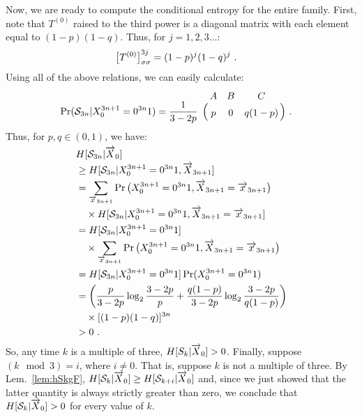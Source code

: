 Now, we are ready to compute the conditional entropy for the entire family.
First, note that $T^{(0)}$ raised to the third power is a diagonal matrix with 
each element equal to $(1-p)(1-q)$. Thus, for $j=1,2,3\ldots$:
\begin{align*}
\bigl[T^{(0)}\bigr]^{3j}_{\sigma\sigma} &= (1-p)^j(1-q)^j ~.
\end{align*}
Using all of the above relations, we can easily calculate:
\begin{align*}
\Pr(\CausalState_{3n} | \MeasSymbol_0^{3n+1} = 0^{3n}1)
&= \frac{1}{3-2p}
\bordermatrix{
& A & B & C \cr
& p & 0 & q(1-p)
} ~.
\end{align*}
Thus, for $p,q \in (0,1)$, we have:
\begin{align*}
&H[\mathcal{S}_{3n} | \smash{\overrightarrow{{X}}}_0] \\
    &\geq H[\mathcal{S}_{3n} | {X}_0^{3n+1} = 0^{3n}1, 
                                \smash{\overrightarrow{{X}}}_{3n+1}] \\
    &= \sum_{\smash{\overrightarrow{{x}}}_{3n+1}} \Pr\left(
                {X}_0^{3n+1} = 0^{3n}1, 
                \smash{\overrightarrow{{X}}}_{3n+1}=\smash{\overrightarrow{{x}}}_{3n+1}
               \right) \\
    &\quad\times H[\mathcal{S}_{3n} | {X}_0^{3n+1} = 0^{3n}1, \smash{\overrightarrow{{X}}}_{3n+1} = \smash{\overrightarrow{{x}}}_{3n+1}] \\
    &= H[\mathcal{S}_{3n} | {X}_0^{3n+1} = 0^{3n}1] \\
    &\quad\times 
       \sum_{\smash{\overrightarrow{{x}}}_{3n+1}} \Pr\left(
                {X}_0^{3n+1} = 0^{3n}1, 
                \smash{\overrightarrow{{X}}}_{3n+1}=\smash{\overrightarrow{{x}}}_{3n+1}
             \right) \\
    &= H[\mathcal{S}_{3n} | {X}_0^{3n+1}=0^{3n}1] 
       \Pr({X}_0^{3n+1}=0^{3n}1)\\
    &= \left(\frac{p}{3-2p} \log_2 \frac{3-2p}{p} + 
       \frac{q(1-p)}{3-2p} \log_2 \frac{3-2p}{q(1-p)}\right)\\
    &\quad \times [(1-p)(1-q)]^{3n} \\
    &> 0 ~.
\end{align*}
So, any time $k$ is a multiple of three, $H[S_k|\smash{\overrightarrow{{X}}}_0] > 0$.
Finally, suppose $(k \mod 3) = i$, where \mbox{$i\neq 0$}. That is, suppose $k$ 
is not a multiple of three. By Lem.~\ref{lem:hSkgF}, 
$H[\mathcal{S}_k | \smash{\overrightarrow{{X}}}_0] \geq H[\mathcal{S}_{k+i} | \smash{\overrightarrow{{X}}}_0]$ and,
since we just showed that the latter quantity is always strictly greater 
than zero, we conclude that $H[\mathcal{S}_k|\smash{\overrightarrow{{X}}}_0] > 0$ for every 
value of $k$.

